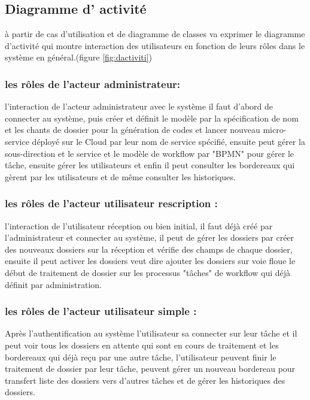 \subsection{Diagramme d' activité  }

à partir de cas d'utilisation et de diagramme de classes  va exprimer  le diagramme d'activité qui  montre interaction des  utilisateurs   en fonction de leurs rôles dans le système en général.(figure \ref{fig:dactiviti})

\subsubsection{les rôles de l'acteur administrateur: }
l'interaction de l'acteur administrateur avec le système il faut d'abord de connecter au système, puis créer et définit le modèle par la spécification de nom et les chants de dossier pour la génération de codes et lancer nouveau micro-service déployé sur le Cloud par leur nom de service spécifié, ensuite peut gérer la sous-direction et le service et le modèle de workflow par "BPMN" pour gérer le tâche, ensuite gérer les utilisateurs et enfin il peut consulter les bordereaux qui gèrent par les utilisateurs et de même consulter les historiques.

\subsubsection{les rôles de l'acteur utilisateur rescription : }
l'interaction de l'utilisateur réception ou bien initial, il faut déjà créé par l'administrateur et connecter au système, il peut de gérer les dossiers par créer des nouveaux dossiers sur la réception et vérifie des champs de chaque dossier, ensuite il peut activer les dossiers veut dire ajouter les dossiers sur voie floue le début de traitement de dossier sur les processus "tâches" de workflow qui déjà définit par administration. 

\subsubsection{les rôles de l'acteur utilisateur simple : } 
Après l'authentification au système l'utilisateur sa connecter sur leur tâche et il peut voir tous les dossiers en attente qui sont en cours de traitement et les bordereaux qui déjà reçu par une autre tâche, l'utilisateur peuvent finir le traitement de dossier par leur tâche, peuvent gérer un nouveau bordereau pour transfert liste des dossiers vers d'autres tâches et de gérer les historiques des dossiers.
   
